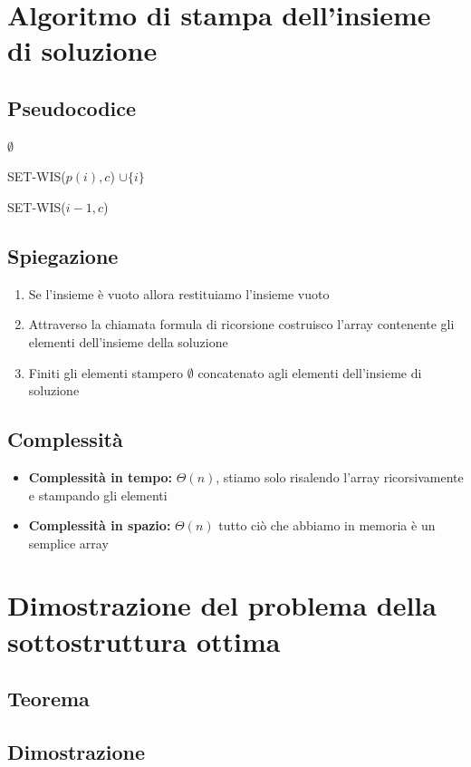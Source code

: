 \newpage
\section{Algoritmo di stampa dell'insieme di soluzione}
\subsection{Pseudocodice}
\begin{algorithm}
    \caption{SET-WIS}
    \begin{algorithmic}
                \State \Return $\emptyset$

                \Else
                        \State \Return SET-WIS($p(i),c$) $\cup \{i\}$

                        \Else
                            \State \Return SET-WIS($i-1,c$)
                    \EndIf
            \EndIf
        \EndProcedure
    \end{algorithmic}
\end{algorithm}
\subsection{Spiegazione}
    \begin{enumerate}
        \item Se l'insieme è vuoto allora restituiamo l'insieme vuoto
        \item Attraverso la chiamata formula di ricorsione costruisco l'array contenente gli elementi dell'insieme della soluzione
        \item Finiti gli elementi stampero $\emptyset$ concatenato agli elementi dell'insieme di soluzione
    \end{enumerate}
\subsection{Complessità}
\begin{itemize}
    \item \textbf{Complessità in tempo:} $\Theta(n)$, stiamo solo risalendo l'array ricorsivamente e stampando gli elementi
    \item \textbf{Complessità in spazio:} $\Theta(n)$ tutto ciò che abbiamo in memoria è un semplice array
\end{itemize}

\newpage
\section{Dimostrazione del problema della sottostruttura ottima}
\subsection{Teorema}
\subsection{Dimostrazione}

